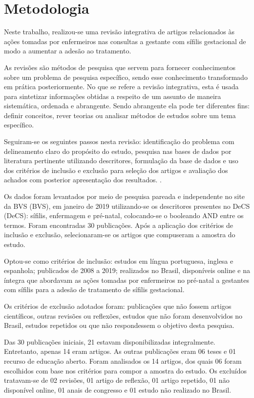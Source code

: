 \chapter{Metodologia}
\label{chap:metodologia}

Neste trabalho, realizou-se uma revisão integrativa de artigos relacionados às ações tomadas por enfermeiros nas consultas a gestante com sífilis gestacional de modo a aumentar a adesão ao tratamento.

As revisões são métodos de pesquisa que servem para fornecer conhecimentos sobre um problema de pesquisa específico, sendo esse conhecimento transformado em prática posteriormente. No que se refere a revisão integrativa, esta é usada para sintetizar informações obtidas a respeito de um assunto de maneira sistemática, ordenada e abrangente. Sendo abrangente ela pode ter diferentes fins: definir conceitos, rever teorias ou analisar métodos de estudos sobre um tema específico. \cite{mendes2005revisao}

Seguiram-se os seguintes passos nesta revisão: identificação do problema com delineamento claro do propósito do estudo, pesquisa nas bases de dados por literatura pertinente utilizando descritores, formulação da base de dados e uso dos critérios de inclusão e exclusão para seleção dos artigos e avaliação dos achados com posterior apresentação dos resultados. \cite[p. 04]{teixeira2014integrative}.

Os dados foram levantados por meio de pesquisa pareada e independente no site da \acrshort{BVS} (\acrlong{BVS}), em janeiro de 2019 utilizando-se os descritores presentes no \acrshort{DeCS} (\acrlong{DeCS}): sífilis, enfermagem e pré-natal, colocando-se o booleando AND entre os termos. Foram encontradas 30 publicações. Após a aplicação dos critérios de inclusão e exclusão, selecionaram-se os artigos que compuseram a amostra do estudo.

Optou-se como critérios de inclusão: estudos em língua portuguesa, inglesa e espanhola; publicados de 2008 a 2019; realizados no Brasil, disponíveis online e na íntegra que abordavam as ações tomadas por enfermeiros no pré-natal a gestantes com sífilis para a adesão de tratamento de sífilis gestacional. 

Os critérios de exclusão adotados foram: publicações que não fossem artigos científicos, outras revisões ou reflexões, estudos que não foram desenvolvidos no Brasil, estudos repetidos ou que não respondessem o objetivo desta pesquisa. 

Das 30 publicações iniciais, 21 estavam disponibilizadas integralmente. Entretanto,  apenas 14 eram artigos. As outras publicações eram 06 teses e 01 recurso de educação aberto. Foram analisados os 14 artigos, dos quais 06 foram escolhidos com base nos critérios para compor a amostra do estudo. Os excluídos tratavam-se de 02 revisões, 01 artigo de reflexão, 01 artigo repetido, 01 não disponível online, 01 anais de congresso e 01 estudo não realizado no Brasil. 

